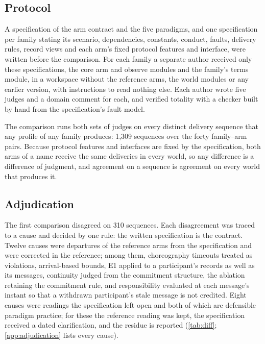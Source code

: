 \subsection{Protocol}

A specification of the arm contract and the five paradigms, and one specification per family stating its scenario, dependencies, constants, conduct, faults, delivery rules, record views and each arm's fixed protocol features and interface, were written before the comparison. For each family a separate author received only these specifications, the core arm and observe modules and the family's terms module, in a workspace without the reference arms, the world modules or any earlier version, with instructions to read nothing else. Each author wrote five judges and a domain comment for each, and verified totality with a checker built by hand from the specification's fault model.

The comparison runs both sets of judges on every distinct delivery sequence that any profile of any family produces: 1,309 sequences over the forty family--arm pairs. Because protocol features and interfaces are fixed by the specification, both arms of a name receive the same deliveries in every world, so any difference is a difference of judgment, and agreement on a sequence is agreement on every world that produces it.

\subsection{Adjudication}

The first comparison disagreed on 310 sequences. Each disagreement was traced to a cause and decided by one rule: the written specification is the contract. Twelve causes were departures of the reference arms from the specification and were corrected in the reference; among them, choreography timeouts treated as violations, arrival-based bounds, E1 applied to a participant's records as well as its messages, continuity judged from the commitment structure, the ablation retaining the commitment rule, and responsibility evaluated at each message's instant so that a withdrawn participant's stale message is not credited. Eight causes were readings the specification left open and both of which are defensible paradigm practice; for these the reference reading was kept, the specification received a dated clarification, and the residue is reported (\cref{tab:diff}; \cref{app:adjudication} lists every cause).

